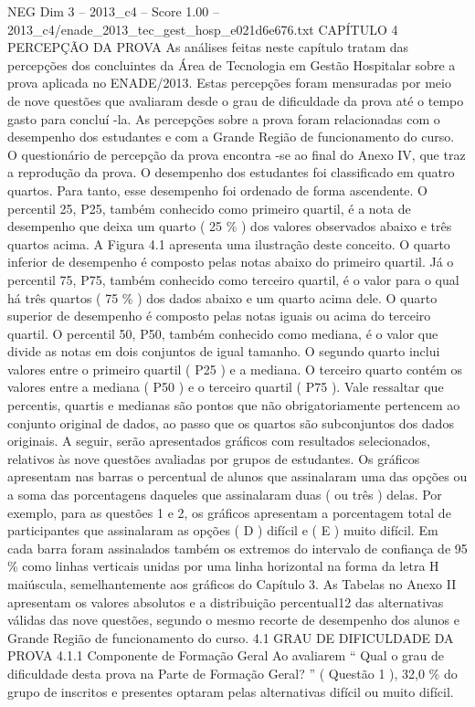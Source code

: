 \begin{textsample}{NEG Dim 3 – 2013\_c4 – Score 1.00 – 2013\_c4/enade\_2013\_tec\_gest\_hosp\_e021d6e676.txt}  \label{ex:f3_neg_143}
CAPÍTULO 4 PERCEPÇÃO DA PROVA As análises feitas neste capítulo tratam das percepções dos concluintes da Área de Tecnologia em Gestão Hospitalar sobre a prova aplicada no ENADE/2013.
Estas percepções foram mensuradas por meio de nove questões que avaliaram desde o grau de dificuldade da prova até o tempo gasto para concluí -la.
As percepções sobre a prova foram relacionadas com o desempenho dos estudantes e com a Grande Região de funcionamento do curso.
O questionário de percepção da prova encontra -se ao final do Anexo IV, que traz a reprodução da prova.
O desempenho dos estudantes foi classificado em quatro quartos.
Para tanto, esse desempenho foi ordenado de forma ascendente.
O percentil 25, P25, também conhecido como primeiro quartil, é a nota de desempenho que deixa um quarto ( 25 \% ) dos valores observados abaixo e três quartos acima.
A Figura 4.1 apresenta uma ilustração deste conceito.
O quarto inferior de desempenho é composto pelas notas abaixo do primeiro quartil.
Já o percentil 75, P75, também conhecido como terceiro quartil, é o valor para o qual há três quartos ( 75 \% ) dos dados abaixo e um quarto acima dele.
O quarto superior de desempenho é composto pelas notas iguais ou acima do terceiro quartil.
O percentil 50, P50, também conhecido como mediana, é o valor que divide as notas em dois conjuntos de igual tamanho.
O segundo quarto inclui valores entre o primeiro quartil ( P25 ) e a mediana.
O terceiro quarto contém os valores entre a mediana ( P50 ) e o terceiro quartil ( P75 ).
Vale ressaltar que percentis, quartis e medianas são pontos que não obrigatoriamente pertencem ao conjunto original de dados, ao passo que os quartos são subconjuntos dos dados originais.
A seguir, serão apresentados gráficos com resultados selecionados, relativos às nove questões avaliadas por grupos de estudantes.
Os gráficos apresentam nas barras o percentual de alunos que assinalaram uma das opções ou a soma das porcentagens daqueles que assinalaram duas ( ou três ) delas.
Por exemplo, para as questões 1 e 2, os gráficos apresentam a porcentagem total de participantes que assinalaram as opções ( D ) difícil e ( E ) muito difícil.
Em cada barra foram assinalados também os extremos do intervalo de confiança de 95 \% como linhas verticais unidas por uma linha horizontal na forma da letra H maiúscula, semelhantemente aos gráficos do Capítulo 3.
As Tabelas no Anexo II apresentam os valores absolutos e a distribuição percentual12 das alternativas válidas das nove questões, segundo o mesmo recorte de desempenho dos alunos e Grande Região de funcionamento do curso. 4.1 GRAU DE DIFICULDADE DA PROVA 4.1.1 Componente de Formação Geral Ao avaliarem “ Qual o grau de dificuldade desta prova na Parte de Formação Geral? ” ( Questão 1 ), 32,0 \% do grupo de inscritos e presentes optaram pelas alternativas difícil ou muito difícil.

\end{textsample}
